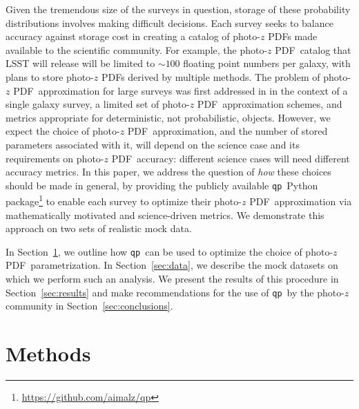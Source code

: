 \documentclass[\docopts]{\docclass}
\newcommand{\qp}{\texttt{qp}}
\newcommand{\pz}{photo-$z$ PDF}
\begin{document}
Given the tremendous size of the surveys in question, storage of these 
probability distributions involves making difficult decisions.
Each survey seeks to balance accuracy against storage cost in creating a 
catalog of \pz s made available to the scientific community.
For example, the \pz\ catalog that LSST will release will be limited to 
$\sim100$ floating point numbers per galaxy\citet[section 
4.2.2]{juric_data_2017}, with plans to store \pz s derived by multiple methods.
The problem of \pz\ approximation for large surveys was first addressed in 
\citet{carrasco_kind_sparse_2014} in the context of a single galaxy survey, a 
limited set of \pz\ approximation schemes, and metrics appropriate for 
deterministic, not probabilistic, objects.
However, we expect the choice of \pz\ approximation, and the number of stored 
parameters associated with it, will depend on the science case and its 
requirements on \pz\ accuracy: different science cases will need different 
accuracy metrics.
In this paper, we address the question of \textit{how} these choices should be 
made in general, by providing the publicly available \qp\ Python 
package\footnote{\url{https://github.com/aimalz/qp}} to enable each survey to 
optimize their \pz\ approximation via mathematically motivated and 
science-driven metrics.
We demonstrate this approach on two sets of realistic mock data.

In Section~\ref{sec:methods}, we outline how \qp\ can be used to optimize the 
choice of \pz\ parametrization.
In Section~\ref{sec:data}, we describe the mock datasets on which we perform 
such an analysis.
We present the results of this procedure in Section~\ref{sec:results} and make 
recommendations for the use of \qp\ by the photo-$z$ community in 
Section~\ref{sec:conclusions}.

\section{Methods}
\label{sec:methods}
\end{document}
